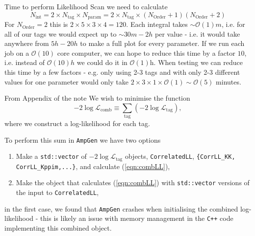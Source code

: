 \begin{frame}{Time to perform Likelihood Scan}
we need to calculate 
\begin{equation}
   N_\text{int} = 2 \times N_\text{tag} \times N_\text{param}  = 2 \times N_\text{tag} \times (N_\text{Order} + 1) (N_\text{Order} + 2)
\end{equation}
For $N_\text{Order} = 2$ this is $2 \times 5 \times 3 \times 4 = 120$. Each integral takes $\sim \mathcal{O}(1)m$, i.e. for all of our tags we would expect up to $\sim 30m - 2h$ per value - i.e. it would take anywhere from $5h - 20h$ to make a full plot for every parameter. If we run each job on a $\mathcal{O}(10)$ core computer, we can hope to reduce this time by a factor $10$, i.e. instead of $\mathcal{O}(10)h$ we could do it in $\mathcal{O}(1)$h.
When testing we can reduce this time by a few factors - e.g. only using 2-3 tags and with only 2-3 different values for one parameter would only take $2 \times 3 \times 1 \times \mathcal{O}(1) \sim \mathcal{O}(5)$ minutes. 
\end{frame}
\begin{frame}{From Appendix of the note}
We wish to minimise the function
\begin{equation}
    -2\log\mathcal{L}_\text{comb} \equiv \sum_\text{tag} \left(-2 \log \mathcal{L}_\text{tag}\right) \label{eqn:combLL},
\end{equation}
where we construct a log-likelihood for each tag.

To perform this sum in \texttt{AmpGen} we have two options
\begin{enumerate}
    \item Make a \texttt{std::vector} of $-2\log\mathcal{L}_\text{tag}$ objects, \texttt{CorrelatedLL}, \texttt{\{CorrLL\_KK, CorrLL\_Kppim,...\}}, and calculate (\ref{eqn:combLL}),
    \item Make the object that calculates (\ref{eqn:combLL}) with \texttt{std::vector} versions of the input to \texttt{CorrelatedLL},
\end{enumerate}
in the first case, we found that \texttt{AmpGen} crashes when initialising the combined log-likelihood - this is likely an issue with memory management in the \texttt{C++} code implementing this combined object. 
\end{frame}
